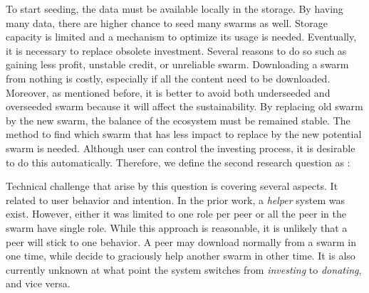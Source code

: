 To start seeding, the data must be available locally in the storage. By having many data, there are higher chance to seed many swarms as well. Storage capacity is limited and a mechanism to optimize its usage is needed. Eventually, it is necessary to replace obsolete investment. Several reasons to do so such as gaining less profit, unstable credit, or unreliable swarm. Downloading a swarm from nothing is costly, especially if all the content need to be downloaded. Moreover, as mentioned before, it is better to avoid both underseeded and overseeded swarm because it will affect the sustainability. By replacing old swarm by the new swarm, the balance of the ecosystem must be remained stable. The method to find which swarm that has less impact to replace by the new potential swarm is needed. Although user can control the investing process, it is desirable to do this automatically. Therefore, we define the second research question as : 

	
Technical challenge that arise by this question is covering several aspects. It related to user behavior and intention. In the prior work, a \textit{helper} system was exist. However, either it was limited to one role per peer or all the peer in the swarm have single role. While this approach is reasonable, it is unlikely that a peer will stick to one behavior. A peer may download normally from a swarm in one time, while decide to graciously help another swarm in other time. It is also currently unknown at what point the system switches from \textit{investing} to \textit{donating}, and vice versa.